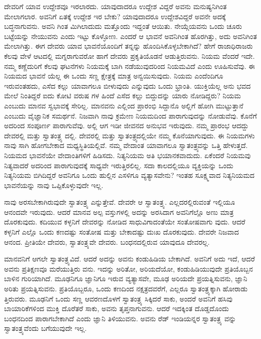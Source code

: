 ದೇವರಿಗೆ ಯಾವ ಉದ್ದೇಶವೂ ಇರಲಾರದು. ಯಾವುದಾದರೂ ಉದ್ದೇಶ ವಿದ್ದರೆ ಅವನು ಮನುಷ್ಯನಿಗಿಂತ ಮೇಲಾಗಲಾರ. ಅವನಿಗೆ ಏತಕ್ಕೆ ಉದ್ದೇಶ ಇರ ಬೇಕು? ಯಾವುದಾದರೂ ಉದ್ದೇಶವಿದ್ದರೆ ಅವನೇ ಅದಕ್ಕೆ ಬದ್ಧನಾಗುವನು. ಅವನಿ ಗಿಂತ ಮಿಗಿಲಾದುದು ಮತ್ತೊಂದು ಇದ್ದಂತೆ ಆಯಿತು. ನೇಯ್ಗೆಯವನು ಒಂದು ಚೂರು ಬಟ್ಟೆಯನ್ನು ನೇಯುವನು ಎಂದು ಇಟ್ಟು ಕೊಳ್ಳೋಣ. ಎಂದರೆ ಆ ಭಾವನೆ ಅವನಿಗಿಂತ ಹೊರಗಿತ್ತು, ಅದು ಅವನಿಗಿಂತ ಮೇಲಾಗಿತ್ತು. ಈಗ ದೇವರು ಯಾವ ಭಾವನೆಯೊಂದಿಗೆ ತನ್ನನ್ನು ಹೊಂದಿಸಿಕೊಳ್ಳಬೇಕಾಗಿದೆ? ಹೇಗೆ ರಾಜಾಧಿರಾಜರು ಕೆಲವು ವೇಳೆ ಆಟದಲ್ಲಿ ಮಗ್ನರಾಗುವರೋ ಹಾಗೆ ದೇವರು ಪ್ರಕೃತಿಯೊಡನೆ ಆಡುತ್ತಿರುವನು. ನಿಯಮ ವೆಂದರೆ ಇದೇ. ನಮ್ಮ ಕಣ್ಣೆದುರಿಗೆ ಕೆಲವು ಘಟನೆಗಳು ನಿಯಮಕ್ಕೆ ಬಾಗಿ ನಡೆಯುವುದರಿಂದ ನಿಯಮವಿದೆ ಎಂದು ಊಹಿಸುವೆವು. ಈ ನಿಯಮದ ಭಾವನೆ ಯೆಲ್ಲ ಈ ಒಂದು ಸಣ್ಣ ಕ್ಷೇತ್ರಕ್ಕೆ ಮಾತ್ರ ಅನ್ವಯಿಸುವುದು. ನಿಯಮ ಎಂದೆಂದಿಗೂ ಇರುವಂತಹದು, ಎಸೆದ ಕಲ್ಲು ಯಾವಾಗಲೂ ಬೀಳುವುದು ಎನ್ನುವುದು ಒಂದು ಭ್ರಾಂತಿ. ಯುಕ್ತಿಯೆಲ್ಲ ಅನು ಭವದ ಮೇಲೆ ನಿಂತಿದ್ದರೆ ಐದು ಕೋಟಿ ವರುಷ ಗಳ ಹಿಂದೆ ಎಸೆದ ಕಲ್ಲು ಬಿದ್ದುದನ್ನು ಯಾರು ನೋಡಿದ್ದರು? ನಿಯಮ ಎಂಬುದು ಮಾನವ ಸ್ವಭಾವಕ್ಕೆ ಸೇರಿಲ್ಲ. ಮಾನವನು ಎಲ್ಲಿಂದ ಪ್ರಾರಂಭಿ ಸಿದ್ದಾನೊ ಅಲ್ಲಿಗೆ ಹೋಗಿ ಮುಟ್ಟುತ್ತಾನೆ ಎಂಬುದು ವೈಜ್ಞಾನಿಕ ಸಮರ್ಥನೆ. ನಿಜವಾಗಿ ನಾವು ಕ್ರಮೇಣ ನಿಯಮದಿಂದ ಪಾರಾಗುವುದನ್ನು ನೋಡುವೆವು. ಕೊನೆಗೆ ಅದರಿಂದ ಸಂಪೂರ್ಣ ಪಾರಾಗುವೆವು. ಅಲ್ಲಿ ಆಗ ಇಡೀ ಜೀವನದ ಅನುಭವ ಇರುವುದು. ನಮ್ಮ ಪ್ರಾರಂಭ ಆದದ್ದು ದೇವರಲ್ಲಿ ಮತ್ತು ಸ್ವಾತಂತ್ರ್ಯ ದಲ್ಲಿ. ದೇವರಲ್ಲಿ ಮತ್ತು ಸ್ವಾತಂತ್ರ್ಯದಲ್ಲಿಯೇ ನಮ್ಮ ಕೊನೆಯಾಗುವುದು. ಈ ನಿಯಮಗಳು ನಾವು ಸಾಗಿ ಹೋಗಬೇಕಾದ ಮಧ್ಯಸ್ಥಿತಿಯಲ್ಲಿವೆ. ನಮ್ಮ ವೇದಾಂತ ಯಾವಾಗಲೂ ಸ್ವಾತಂತ್ರ್ಯವನ್ನು ಒತ್ತಿ ಹೇಳುತ್ತದೆ. ನಿಯಮದ ಭಾವನೆಯೇ ವೇದಾಂತಿಗಳಿಗೆ ಹಿಡಿಸದು. ನಿತ್ಯನಿಯಮ ಅತಿ ಭಯಾನಕವಾದುದು. ಏಕೆಂದರೆ ನಿಯಮವು ನಿತ್ಯವಾದರೆ ಅದರಿಂದ ಪಾರಾಗುವುದಕ್ಕೆ ಸಾಧ್ಯವೇ ಇರುತ್ತಿರಲಿಲ್ಲ. ಸದಾ ಕಾಲದಲ್ಲಿಯೂ ವ್ಯಕ್ತಿಯನ್ನು ಒಂದು ನಿತ್ಯನಿಯಮ ಬಿಗಿದಿದ್ದರೆ ಅವನಿಗೂ ಒಂದು ಹುಲ್ಲಿನ ಎಸಳಿಗೂ ವ್ಯತ್ಯಾಸವೇನು? ಇಂತಹ ಸೂಕ್ಷ್ಮವಾದ ನಿತ್ಯನಿಯಮದ ಭಾವನೆಯನ್ನು ನಾವು ಒಪ್ಪಿಕೊಳ್ಳುವುದೇ ಇಲ್ಲ.

ನಾವು ಅರಸಬೇಕಾಗಿರುವುದೇ ಸ್ವಾತಂತ್ರ್ಯ ಎನ್ನುತ್ತೇವೆ. ದೇವರೇ ಆ ಸ್ವಾತಂತ್ರ್ಯ. ಎಲ್ಲದರಲ್ಲಿರುವಂತೆ ಇಲ್ಲಿಯೂ ಆನಂದವೇ ಇರುವುದು. ಆದರೆ ಮಾನವ ಅಲ್ಪ ವಸ್ತುಗಳಲ್ಲಿ ಅದನ್ನು ಅರಸಿದಾಗ ಅವನಿಗೆಲ್ಲೊ ಅಣು ಮಾತ್ರ ದೊರಕುವುದು. ಕದಿಯುವ ಕಳ್ಳನಿಗೆ ದೇವರನ್ನು ನೋಡಿದ ಸಾಧುವಿಗಾದಂತೆಯೇ ಸಂತೋಷವಾಗು ವುದು. ಆದರೆ ಕಳ್ಳನಿಗೆ ಎಲ್ಲೊ ಒಂದು ಕಣದಷ್ಟು ಸಂತೋಷ ಮತ್ತು ಬೇಕಾದಷ್ಟು ದುಃಖ ದೊರಕುವುದು. ದೇವರೇ ನಿಜವಾದ ಆನಂದ. ಪ್ರೀತಿಯೇ ದೇವರು, ಸ್ವಾತಂತ್ರ್ಯವೇ ದೇವರು. ಬಂಧನದಲ್ಲಿರುವ ಯಾವುದೂ ದೇವರಲ್ಲ.

ಮಾನವನಿಗೆ ಆಗಲೇ ಸ್ವಾತಂತ್ರ್ಯವಿದೆ. ಆದರೆ ಅದನ್ನು ಅವನು ಕಂಡುಹಿಡಿಯ ಬೇಕಾಗಿದೆ. ಅವನಿಗೆ ಅದು ಇದೆ, ಆದರೆ ಅವನು ಪ್ರತಿಕ್ಷಣವೂ ಮರೆಯುತ್ತಿರು ವನು. ಇದನ್ನು ಅರಿತೋ, ಅರಿಯದೆಯೋ, ಕಂಡುಹಿಡಿಯುವುದೇ ಪ್ರತಿಯೊಬ್ಬನ ಬಾಳಿನ ಗುರಿಯಾಗಿದೆ. ಮೂಢನಿಗೂ ಜ್ಞಾನಿಗೂ ಇರುವ ವ್ಯತ್ಯಾಸವೇ, ಮೂಢ ಅರಿಯದೇ ಪ್ರಯತ್ನಿಸುವನು, ಜ್ಞಾನಿ ಅರಿತು ಪ್ರಯತ್ನಿಸುವನು. ಪ್ರತಿಯೊಬ್ಬರೂ, ಒಂದು ಕಣದಿಂದ ನಕ್ಷತ್ರದವರೆಗೆ, ಎಲ್ಲರೂ ಸ್ವಾತಂತ್ರ್ಯಕ್ಕಾಗಿ ಹೋರಾಡು ತ್ತಿರುವರು. ಮೂಢನಿಗೆ ಒಂದು ಸಣ್ಣ ಆವರಣದೊಳಗೆ ಸ್ವಾತಂತ್ರ್ಯ ಸಿಕ್ಕಿದರೆ ಸಾಕು, ಅಂದರೆ ಅವನಿಗೆ ಹಸಿವು ಬಾಯಾರಿಕೆಗಳಿಂದ ಮುಕ್ತಿ ದೊರೆತರೆ ಸಾಕು, ಅವನು ತೃಪ್ತನಾಗುವನು. ಆದರೆ ಇದಕ್ಕಿಂತ ದೊಡ್ಡದೊಂದು ಬಂಧನದಿಂದ ಪಾರಾಗಬೇಕಾಗಿದೆ ಎಂದು ಜ್ಞಾನಿ ತಿಳಿಯುವನು. ಅವನು ರೆಡ್​ ಇಂಡಿಯನ್ನರ ಸ್ವಾತಂತ್ರ್ಯ ವನ್ನು ಸ್ವಾತಂತ್ರ್ಯವೆಂದು ಬಗೆಯುವುದೇ ಇಲ್ಲ.

